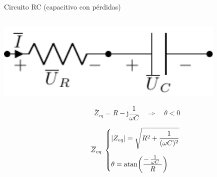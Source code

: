 \documentclass[aspectratio=169, usenames,svgnames,dvipsnames]{beamer}
\newcommand{\atan}{\mathrm{atan}}
\begin{document}
\begin{frame}{Circuito RC \hspace{3mm}(capacitivo con pérdidas)}
    \begin{columns}
    \begin{column}{0.45\columnwidth}
        \begin{center}
            \hspace*{12mm}\includegraphics[width=0.83\textwidth]{../figs/RC.pdf}
        \end{center}

        \vspace{-4mm}
        \[
            \qquad \overline{Z}_{eq} =  
            R - \mathrm{j} \frac{1}{\omega C} \quad \Rightarrow \quad \boxed{\theta < 0}
        \]

        \vspace{-4mm}
        \[
            \quad\;\; \overline{Z}_{eq} \;
            \begin{dcases}
                |Z_{eq}| = \sqrt{R^2 + \frac{1}{(\omega C)^2}}\\[5pt]
                \theta = \atan{ \left( \frac{-\,\frac{1}{\omega C} \;}{R} \right)}
            \end{dcases}
        \]
    \end{column}
    

\end{columns}
\end{frame}
\end{document}

